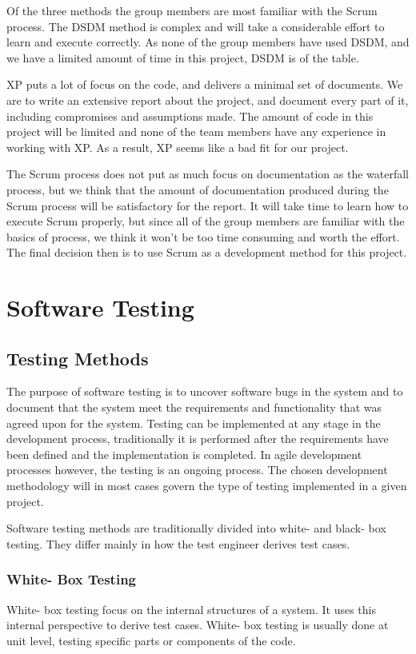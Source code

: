 Of the three methods the group members are most familiar with the Scrum process. The DSDM method is complex and will take a considerable effort to learn and execute correctly. As none of the group members have used DSDM, and we have a limited amount of time in this project, DSDM is of the table. 

XP puts a lot of focus on the code, and delivers a minimal set of documents. We are to write an extensive report about the project, and document every part of it, including compromises and assumptions made. The amount of code in this project will be limited and none of the team members have any experience in working with XP. As a result, XP seems like a bad fit for our project.

The Scrum process does not put as much focus on documentation as the waterfall process, but we think that the amount of documentation produced during the Scrum process will be satisfactory for the report. It will take time to learn how to execute Scrum properly, but since all of the group members are familiar with the basics of process, we think it won’t be too time consuming and worth the effort. The final decision then is to use Scrum as a development method for this project.

\section{Software Testing}

\subsection{Testing Methods}
The purpose of software testing is to uncover software bugs in the system and to document that the system meet the requirements and functionality that was agreed upon for the system. Testing can be implemented at any stage in the development process, traditionally it is performed after the requirements have been defined and the implementation is completed. In agile development processes however, the testing is an ongoing process. The chosen development methodology will in most cases govern the type of testing implemented in a given project.

Software testing methods are traditionally divided into white- and black- box testing. They differ mainly in how the test engineer derives test cases.

\subsubsection{White- Box Testing}
White- box testing focus on the internal structures of a system. It uses this internal perspective to derive test cases. White- box testing is usually done at unit level, testing specific parts or components of the code. 

